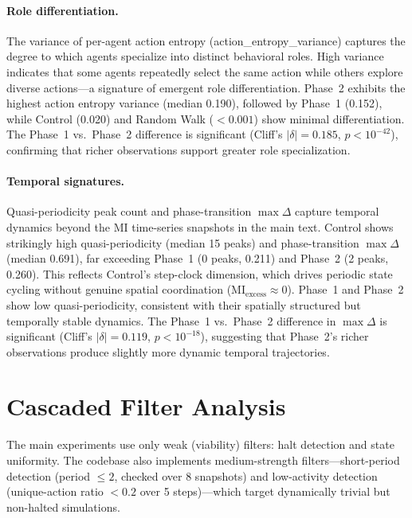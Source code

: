 \documentclass[letterpaper]{article}
\begin{document}
\paragraph{Role differentiation.}
The variance of per-agent action entropy (action\_entropy\_variance)
captures the degree to which agents specialize into distinct behavioral
roles.  High variance indicates that some agents repeatedly select the
same action while others explore diverse actions---a signature of
emergent role differentiation.  Phase~2 exhibits the highest action
entropy variance (median 0.190), followed by Phase~1 (0.152), while
Control (0.020) and Random Walk ($< 0.001$) show minimal differentiation.
The Phase~1 vs.\ Phase~2 difference is significant (Cliff's
$|\delta| = 0.185$, $p < 10^{-42}$), confirming that richer
observations support greater role specialization.

\paragraph{Temporal signatures.}
Quasi-periodicity peak count and phase-transition $\max \Delta$ capture
temporal dynamics beyond the MI time-series snapshots in the main text.
Control shows strikingly high quasi-periodicity (median 15 peaks) and
phase-transition $\max \Delta$ (median 0.691), far exceeding Phase~1
(0 peaks, 0.211) and Phase~2 (2 peaks, 0.260).  This reflects
Control's step-clock dimension, which drives periodic state cycling
without genuine spatial coordination ($\mathrm{MI}_{\mathrm{excess}}
\approx 0$).  Phase~1 and Phase~2 show low quasi-periodicity,
consistent with their spatially structured but temporally stable
dynamics.  The Phase~1 vs.\ Phase~2 difference in $\max \Delta$ is
significant (Cliff's $|\delta| = 0.119$, $p < 10^{-18}$), suggesting
that Phase~2's richer observations produce slightly more dynamic
temporal trajectories.

\section{Cascaded Filter Analysis}
\label{app:cascaded_filters}

The main experiments use only weak (viability) filters: halt detection
and state uniformity.  The codebase also implements medium-strength
filters---short-period detection (period $\leq 2$, checked over 8
snapshots) and low-activity detection (unique-action ratio $< 0.2$ over
5 steps)---which target dynamically trivial but non-halted simulations.
\end{document}
